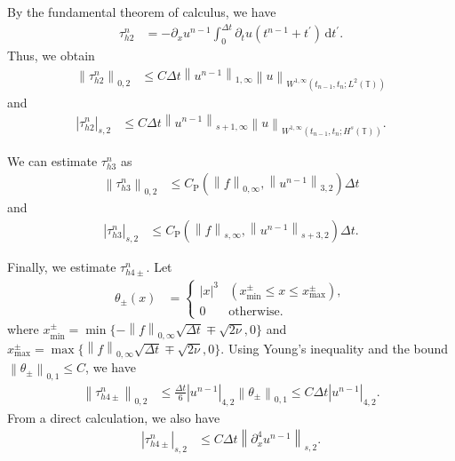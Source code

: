 \documentclass[10pt,a4paper,tbtags,leqno]{amsart}
\theoremstyle{definition}
\numberwithin{equation}{section}
\def\norm#1#2{\left\|#2\right\|_{#1}}
\def\snorm#1#2{\left|#2\right|_{#1}}
\begin{document}
By the fundamental theorem of calculus, we have 
\begin{align} 
  \tau_{h2}^n & = - \partial_x u^{n - 1} \int_{0}^{\Delta t} \partial_t u (t^{n - 1} + t^\prime) \, \mathrm{d} t^\prime.  
\end{align}
Thus, we obtain 
\begin{align}
  \norm{0, 2}{\tau_{h2}^n} & \leq C \Delta t \norm{1, \infty}{u^{n - 1}} \norm{W^{1, \infty}(t_{n - 1}, t_n; L^2 (\mathbb{T}))}{u} \label{t20}
\end{align}
and 
\begin{align}
  \snorm{s, 2}{\tau_{h2}^n} & \leq C \Delta t \norm{s + 1, \infty}{u^{n - 1}} \norm{W^{1, \infty}(t_{n - 1}, t_n; H^s (\mathbb{T}))}{u}. \label{t2s}
\end{align}

We can estimate $ \tau_{h3}^n $ as 
\begin{align}
  \norm{0, 2}{\tau_{h3}^n} & \leq C_{\mathrm{P}} (\norm{0,\infty}{f}, \norm{3,2}{u^{n-1}}) \Delta t \label{t30}
\end{align} 
and 
\begin{align}
  \snorm{s, 2}{\tau_{h3}^n} & \leq C_{\mathrm{P}} (\norm{s,\infty}{f}, \norm{s+3,2}{u^{n-1}}) \Delta t. \label{t3s}
\end{align} 

Finally, we estimate $ \tau_{h4\pm}^n $. Let 
\begin{align} 
  \theta_\pm (x) & = \begin{cases} 
    |x|^3 & (x_{\mathrm{min}}^\pm \leq x \leq x_{\mathrm{max}}^\pm), \\ 0 & \text{otherwise}. %
  \end{cases}
\end{align}
where $ x_{\mathrm{min}}^\pm = \min \{- \norm{0,\infty}{f} \sqrt{\Delta t} \mp \sqrt{2 \nu}, 0\} $ and $ x_{\mathrm{max}}^\pm = \max\{\norm{0,\infty}{f}\sqrt{\Delta t} \mp \sqrt{2 \nu}, 0\} $. %
Using Young's inequality and the bound $ \norm{0, 1}{\theta_\pm} \leq C $, we have 
\begin{align} 
  \norm{0, 2}{\tau_{h4\pm}^n} & \leq \frac{\Delta t}{6} \snorm{4, 2}{u^{n - 1}} \norm{0, 1}{\theta_\pm} \leq C \Delta t \snorm{4, 2}{u^{n - 1}}. \label{t40} 
\end{align} 
From a direct calculation, we also have 
\begin{align} 
  \snorm{s, 2}{\tau_{h4\pm}^n} & \leq C \Delta t \norm{s, 2}{\partial_x^4 u^{n - 1}}. \label{t4s} 
\end{align} 
\end{document}
